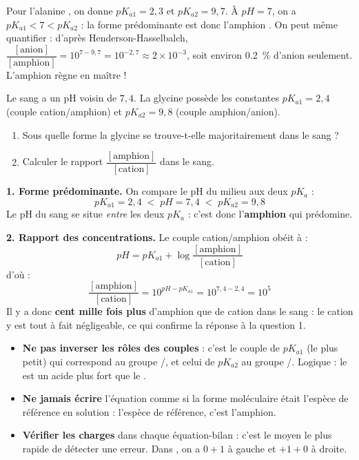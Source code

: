 \documentclass[11pt]{article}
\begin{document}
\begin{exemplebox}[L'alanine à pH = 7]
Pour l'alanine , on donne $pK_{a1} = 2{,}3$ et $pK_{a2} = 9{,}7$. À $pH = 7$, on a $pK_{a1} < 7 < pK_{a2}$ : la forme prédominante est donc l'amphion . On peut même quantifier : d'après Henderson-Hasselbalch, $\dfrac{[\text{anion}]}{[\text{amphion}]} = 10^{7-9{,}7} = 10^{-2{,}7} \approx 2 \times 10^{-3}$, soit environ \SI{0,2}{\percent} d'anion seulement. L'amphion règne en maître !
\end{exemplebox}

\begin{exoresolu}
Le sang a un pH voisin de $7{,}4$. La glycine  possède les constantes $pK_{a1} = 2{,}4$ (couple cation/amphion) et $pK_{a2} = 9{,}8$ (couple amphion/anion).
\begin{enumerate}
\item Sous quelle forme la glycine se trouve-t-elle majoritairement dans le sang ?
\item Calculer le rapport $\dfrac{[\text{amphion}]}{[\text{cation}]}$ dans le sang.
\end{enumerate}
\tcblower
\textbf{1. Forme prédominante.} On compare le pH du milieu aux deux $pK_a$ :
\[ pK_{a1} = 2{,}4 \;<\; pH = 7{,}4 \;<\; pK_{a2} = 9{,}8 \]
Le pH du sang se situe \emph{entre} les deux $pK_a$ : c'est donc l'\textbf{amphion}  qui prédomine.

\textbf{2. Rapport des concentrations.} Le couple cation/amphion obéit à :
\[ pH = pK_{a1} + \log \frac{[\text{amphion}]}{[\text{cation}]} \]
d'où :
\[ \frac{[\text{amphion}]}{[\text{cation}]} = 10^{pH - pK_{a1}} = 10^{7{,}4 - 2{,}4} = 10^{5} \]
Il y a donc \textbf{cent mille fois plus} d'amphion que de cation dans le sang : le cation y est tout à fait négligeable, ce qui confirme la réponse à la question 1.
\end{exoresolu}

\begin{attention}
\begin{itemize}
\item \textbf{Ne pas inverser les rôles des couples} : c'est le couple de $pK_{a1}$ (le plus petit) qui correspond au groupe /, et celui de $pK_{a2}$ au groupe /. Logique : le  est un acide plus fort que le .
\item \textbf{Ne jamais écrire} l'équation  comme si la forme moléculaire était l'espèce de référence en solution : l'espèce de référence, c'est l'amphion.
\item \textbf{Vérifier les charges} dans chaque équation-bilan : c'est le moyen le plus rapide de détecter une erreur. Dans , on a $0+1$ à gauche et $+1+0$ à droite.
\end{itemize}
\end{attention}
\end{document}
